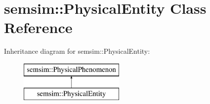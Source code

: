 \hypertarget{classsemsim_1_1PhysicalEntity}{}\section{semsim\+:\+:Physical\+Entity Class Reference}
\label{classsemsim_1_1PhysicalEntity}
Inheritance diagram for semsim\+:\+:Physical\+Entity\+:\begin{figure}[H]
\begin{center}
\leavevmode
\includegraphics[height=2.000000cm]{classsemsim_1_1PhysicalEntity}
\end{center}
\end{figure}
